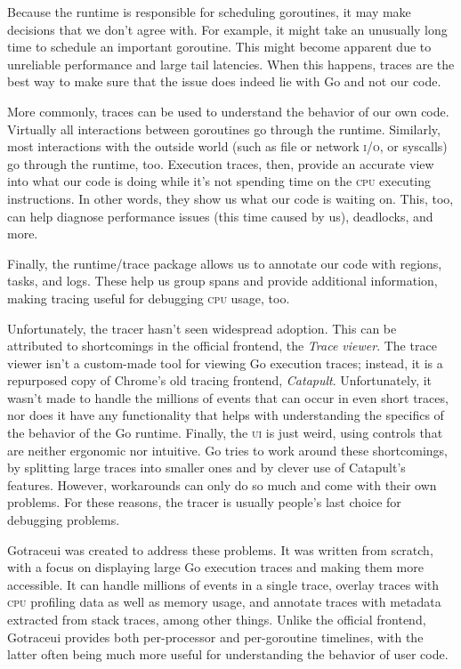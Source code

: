 \documentclass[10pt,letterpaper,oneside,openany,english]{memoir}
\newcommand{\code}[1]{{\ttfamily\mbox{#1}}}
\begin{document}
Because the runtime is responsible for scheduling goroutines, it may make decisions that we don't agree with.
For example, it might take an unusually long time to schedule an important goroutine.
This might become apparent due to unreliable performance and large tail latencies.
When this happens, traces are the best way to make sure that the issue does indeed lie with Go and not our code.

More commonly, traces can be used to understand the behavior of our own code.
Virtually all interactions between goroutines go through the runtime.
Similarly, most interactions with the outside world (such as file or network \textsc{i/o}, or syscalls) go through the runtime, too.
Execution traces, then, provide an accurate view into what our code is doing while it's not spending time on the \textsc{cpu} executing instructions.
In other words, they show us what our code is waiting on.
This, too, can help diagnose performance issues (this time caused by us), deadlocks, and more.

Finally, the \code{runtime/trace} package allows us to annotate our code with regions, tasks, and logs.
These help us group spans and provide additional information, making tracing useful for debugging \textsc{cpu} usage, too.

Unfortunately, the tracer hasn't seen widespread adoption.
This can be attributed to shortcomings in the official frontend, the \emph{Trace viewer}.
The trace viewer isn't a custom-made tool for viewing Go execution traces;
instead, it is a repurposed copy of Chrome's old tracing frontend, \emph{Catapult}.
Unfortunately, it wasn't made to handle the millions of events that can occur in even short traces,
nor does it have any functionality that helps with understanding the specifics of the behavior of the Go runtime.
Finally, the \textsc{ui} is just weird, using controls that are neither ergonomic nor intuitive.
Go tries to work around these shortcomings, by splitting large traces into smaller ones and by clever use of Catapult's features.
However, workarounds can only do so much and come with their own problems.
For these reasons, the tracer is usually people's last choice for debugging problems.

Gotraceui was created to address these problems.
It was written from scratch, with a focus on displaying large Go execution traces and making them more accessible.
It can handle millions of events in a single trace, overlay traces with \textsc{cpu} profiling data as well as memory usage,
and annotate traces with metadata extracted from stack traces, among other things.
Unlike the official frontend, Gotraceui provides both per-processor and per-goroutine timelines,
with the latter often being much more useful for understanding the behavior of user code.
\end{document}
